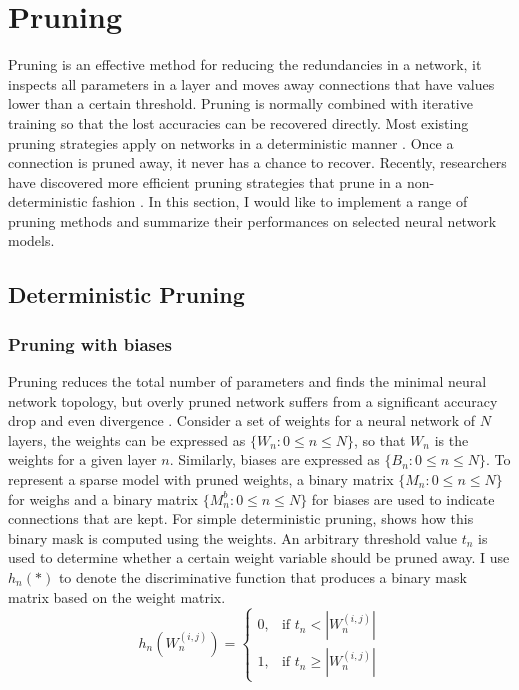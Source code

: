 \documentclass[a4paper,12pt]{report}
\begin{document}
\chapter{Pruning}
\label{sec:dprune}
Pruning is an effective method for reducing the redundancies in a network, it
inspects all parameters in a layer and moves away connections that have values
lower than a certain threshold.
Pruning is normally combined with iterative training so that the lost accuracies can
be recovered directly.
Most existing pruning strategies apply on networks in a deterministic
manner \cite{Han15}.
Once a connection is pruned away, it never has a chance to recover.
Recently, researchers have discovered more efficient pruning strategies that
prune in a non-deterministic fashion \cite{Guo}.
In this section, I would like to implement a range of pruning methods and
summarize their performances on selected neural network models.
\section{Deterministic Pruning}
\subsection{Pruning with biases}
\label{prune_without_biase}
Pruning reduces the total number of parameters and finds the minimal
neural network topology, but overly pruned network suffers from a significant
accuracy drop and even divergence \cite{Thimm}.
Consider a set of weights for a neural network of $N$ layers,
the weights can be expressed as $\{W_n : 0 \leq n \leq N \}$, so that $W_n$ is the
weights for a given layer $n$.
Similarly, biases are expressed as $\{B_n : 0 \leq n \leq N \}$.
To represent a sparse model with pruned weights, a binary matrix
$\{M_n: 0 \leq n \leq N\}$ for weighs and a binary
matrix $\{M^b_n: 0 \leq n \leq N\}$ for biases are used to indicate connections that are kept.
For simple deterministic pruning,  shows how this binary mask
is computed using the weights.
An arbitrary threshold value $t_n$ is used to determine whether a certain weight
variable should be pruned away.
I use $h_n(*)$ to denote the discriminative function that produces a binary mask
matrix based on the weight matrix.
\begin{equation}
  h_n(W_n^{(i,j)}) =
  \begin{cases}
    0, &\text{if } t_n < |W_n^{(i,j)}| \\
    1, &\text{if } t_n \geq |W_n^{(i,j)}|
  \end{cases}
  \label{equ:hfunc}
\end{equation}
\end{document}
